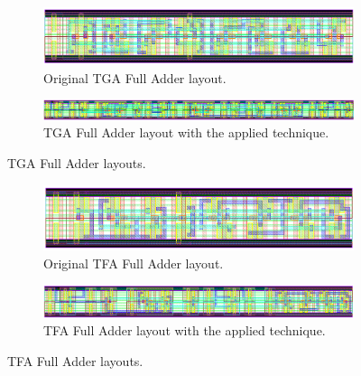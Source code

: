 \documentclass[ecp,tc, english]{iiufrgs}
\begin{document}
\begin{figure}[H]
  \centering
  \begin{subfigure}{\linewidth}
    \centering
    \includegraphics[width=\linewidth]{TGA.png}
    \caption{Original TGA Full Adder layout.}
  \end{subfigure}

  \begin{subfigure}{\linewidth}
    \centering
    \includegraphics[width=\linewidth]{TGAST.png}
    \caption{TGA Full Adder layout with the applied technique.}
  \end{subfigure}  
  \caption{TGA Full Adder layouts.}
  \label{TGA}
\end{figure}

\begin{figure}[H]
  \centering
  \begin{subfigure}{\linewidth}
    \centering
    \includegraphics[width=\linewidth]{TFA.png}
    \caption{Original TFA Full Adder layout.}
  \end{subfigure}

  \begin{subfigure}{\linewidth}
    \centering
    \includegraphics[width=\linewidth]{TFAST.png}
    \caption{TFA Full Adder layout with the applied technique.}
  \end{subfigure}  
  \caption{TFA Full Adder layouts.}
  \label{TFA}
\end{figure}
\end{document}
